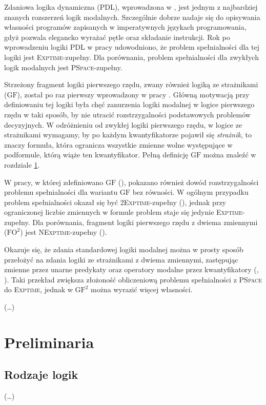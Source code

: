 \documentclass[a4paper]{article}
\begin{document}
Zdaniowa logika dynamiczna (PDL), wprowadzona w \cite{FLA77}, jest jednym z najbardziej znanych rozszerzeń logik modalnych. 
Szczególnie dobrze nadaje się do opisywania własności programów zapisanych w imperatywnych językach programowania, gdyż pozwala elegancko wyrażać pętle oraz składanie instrukcji. 
Rok po wprowadzeniu logiki PDL w pracy \cite{PRA78} udowodniono, że problem spełnialności dla tej logiki jest \textsc{Exptime}-zupełny. 
Dla porównania, problem spełnialności dla zwykłych logik modalnych jest \textsc{PSpace}-zupełny.

Strzeżony fragment logiki pierwszego rzędu, zwany również logiką ze strażnikami ($\mathrm{GF}$), został po raz pierwszy wprowadzony w pracy \cite{ANB96}. 
Główną motywacją przy definiowaniu tej logiki była chęć zanurzenia logiki modalnej w logice pierwszego rzędu w taki sposób, by nie utracić rozstrzygalności podstawowych problemów decyzyjnych. 
W odróżnieniu od zwykłej logiki pierwszego rzędu, w logice ze strażnikami wymagamy, by po każdym kwantyfikatorze pojawił się \emph{strażnik}, to znaczy formuła, która ogranicza wszystkie zmienne wolne występujące w podformule, którą wiąże ten kwantyfikator. 
Pełną definicję $\mathrm{GF}$ można znaleźć w rozdziale \ref{preliminaria}.

W pracy, w której zdefiniowano $\mathrm{GF}$ (\cite{ANB96}), pokazano również dowód rozstrzygalności problemu spełnialności dla wariantu $\mathrm{GF}$ bez równości. 
W ogólnym przypadku problem spełnialności okazał się być \textsc{2Exptime}-zupełny (\cite{GRA98}), jednak przy ograniczonej liczbie zmiennych w formule problem staje się jedynie \textsc{Exptime}-zupełny. 
Dla porównania, fragment logiki pierwszego rzędu z dwiema zmiennymi ($\mathrm{FO^2}$) jest \textsc{NExptime}-zupełny (\cite{GKV97}).

Okazuje się, że zdania standardowej logiki modalnej można w prosty sposób przełożyć na zdania logiki ze strażnikami z dwiema zmiennymi, zastępując zmienne przez unarne predykaty oraz operatory modalne przez kwantyfikatory (\cite{BEN76}, \cite{BEN84}). 
Taki przekład zwiększa złożoność obliczeniową problemu spełnialności z \textsc{PSpace} do \textsc{Exptime}, jednak w $\mathrm{GF^2}$ można wyrazić więcej własności. 

(\dots)


\section{Preliminaria}\label{preliminaria}
\subsection{Rodzaje logik}
(\dots)
\end{document}
